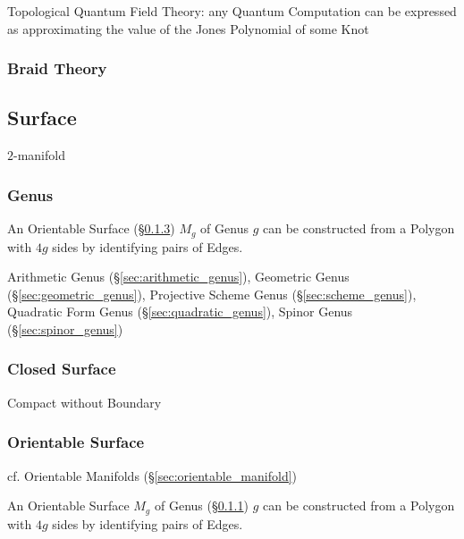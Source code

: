 Topological Quantum Field Theory: any Quantum Computation can be expressed as
approximating the value of the Jones Polynomial of some Knot



\subsubsection{Braid Theory} \label{sec:braid_theory}



\subsection{Surface}\label{sec:surface}

$2$-manifold



\subsubsection{Genus}\label{sec:genus}

An Orientable Surface (\S\ref{sec:orientable_surface}) $M_g$ of Genus $g$ can
be constructed from a Polygon with $4g$ sides by identifying pairs of Edges.

\fist Arithmetic Genus (\S\ref{sec:arithmetic_genus}), Geometric Genus
(\S\ref{sec:geometric_genus}), Projective Scheme Genus
(\S\ref{sec:scheme_genus}), Quadratic Form Genus (\S\ref{sec:quadratic_genus}),
Spinor Genus (\S\ref{sec:spinor_genus})



\subsubsection{Closed Surface}\label{sec:closed_surface}

Compact without Boundary



\subsubsection{Orientable Surface}\label{sec:orientable_surface}\hfill

cf. Orientable Manifolds (\S\ref{sec:orientable_manifold})

An Orientable Surface $M_g$ of Genus (\S\ref{sec:genus}) $g$ can
be constructed from a Polygon with $4g$ sides by identifying pairs of Edges.



